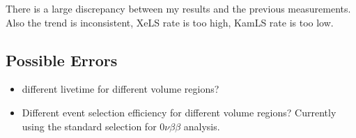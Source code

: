 \documentclass[12pt,letterpaper]{article}
\begin{document}
There is a large discrepancy between my results and the previous measurements. Also the trend is inconsistent, XeLS rate is too high, KamLS rate is too low.
\subsection*{Possible Errors}
\begin{itemize}
	\item different livetime for different volume regions?
	\item Different event selection efficiency for different volume regions? Currently using the standard selection for $0\nu\beta\beta$ analysis.
\end{itemize}
\end{document}
